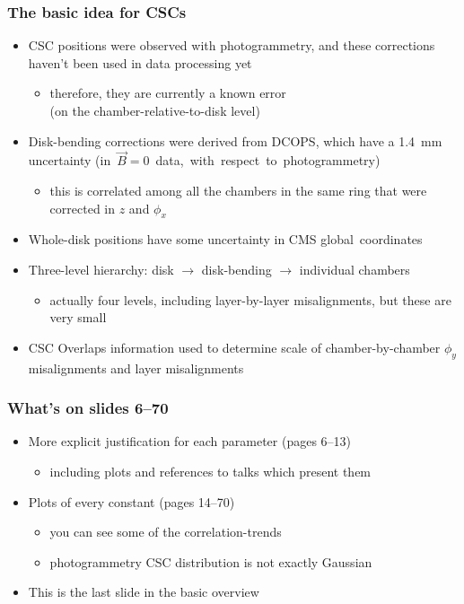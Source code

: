 \documentclass[compress]{beamer}
\begin{document}
\begin{frame}
\frametitle{The basic idea for CSCs}
\begin{itemize}
\item CSC positions were observed with photogrammetry, and these
  corrections haven't been used in data processing yet
\begin{itemize}
\item therefore, they are currently a known error \\ (on the chamber-relative-to-disk level)
\end{itemize}
\item Disk-bending corrections were derived from DCOPS, which have
  a 1.4~mm uncertainty \mbox{(in $\vec{B}=0$ data, with respect to photogrammetry)\hspace{-1 cm}}
\begin{itemize}
\item this is correlated among all the chambers in the same ring that
  were corrected in $z$ and $\phi_x$
\end{itemize}
\item Whole-disk positions have some uncertainty in CMS \mbox{global coordinates\hspace{-1 cm}}
\item Three-level hierarchy: disk $\to$ disk-bending $\to$ individual chambers
\begin{itemize}
\item actually four levels, including layer-by-layer misalignments,
  but these are very small
\end{itemize}
\item CSC Overlaps information used to determine scale of chamber-by-chamber
  $\phi_y$ misalignments and layer misalignments
\end{itemize}
\end{frame}

\begin{frame}
\frametitle{What's on slides 6--70}
\begin{itemize}\setlength{\itemsep}{0.5 cm}
\item More explicit justification for each parameter (pages 6--13)
\begin{itemize}
\item including plots and references to talks which present them
\end{itemize}

\item Plots of every constant (pages 14--70)
\begin{itemize}
\item you can see some of the correlation-trends
\item photogrammetry CSC distribution is not exactly Gaussian
\end{itemize}

\item This is the last slide in the basic overview
\end{itemize}
\label{numpages}
\end{frame}
\end{document}
